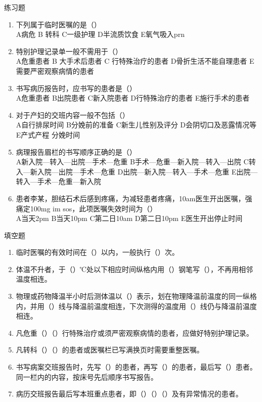 \documentclass[11pt, a4paper]{ctexart}
\begin{document}
\begin{examplebox}{练习题}
	\begin{enumerate}
		\item 下列属于临时医嘱的是（\qquad）\\
		      A病危 \quad B 转科 \quad C一级护理 \quad D半流质饮食 \quad E氧气吸入prn
		\item 特别护理记录单一般不需用于（\qquad）\\
		      A危重患者 \quad B 大手术后患者 \quad C 行特殊治疗的患者 \quad D骨折生活不能自理患者 \quad E 需要严密观察病情的患者
		\item 书写病历报告时，应书写的患者是（\qquad）\\
		      A危重患者 \quad B出院患者 \quad C新入院患者 \quad D行特殊治疗的患者 \quad E施行手术的患者
		\item 对于产妇的交班内容一般不包括（\qquad）\\
		      A自行排尿时间 \quad B分娩前的准备 \quad C新生儿性别及评分 \quad D会阴切口及恶露情况等 \quad E产式产程 分娩时间
		\item 病理报告眉栏的书写顺序正确的是（\qquad）\\
		      A新入院—转入—出院—手术—危重 \quad B手术—危重—新入院—转入—出院 \quad C转入—新入院—出院—手术—危重 \quad D出院—新入院—转入—手术—危重 \quad E出院—转入—手术—危重—新入院
		\item 患者李某，胆结石术后感到疼痛，为减轻患者疼痛，10am医生开出医嘱，强痛定100mg im sos，此项医嘱失效时间为（\qquad）\\
		      A当天2pm \quad B当天10pm \quad C第二日10am \quad D第二日10pm \quad E医生开出停止时间
	\end{enumerate}
\end{examplebox}

\begin{tipsbox}{填空题}
	\begin{enumerate}
		\item 临时医嘱的有效时间在（\qquad）以内，一般执行（\qquad）次。
		\item 体温不升者，于（\qquad）℃处以下相应时间纵格内用（\qquad）钢笔写（\qquad），不再用相邻温度相连。
		\item 物理或药物降温半小时后测体温以（\qquad）表示，划在物理降温前温度的同一纵格内，并用（\qquad）线与降温前温度相连，下次测得的温度用（\qquad）线仍与降温前温度相连。
		\item 凡危重（\qquad）（\qquad）行特殊治疗或须严密观察病情的患者，应做好特别护理记录。
		\item 凡转科（\qquad）（\qquad）的患者或医嘱栏已写满换页时需要重整医嘱。
		\item 书写病案交班报告时，先写（\qquad）的患者，再写（\qquad）的患者，最后写（\qquad）患者。同一栏内的内容，按床号先后顺序书写报告。
		\item 病历交班报告最后写本班重点患者，即（\qquad）（\qquad）（\qquad）及有异常情况的患者。
	\end{enumerate}
\end{tipsbox}
\end{document}
